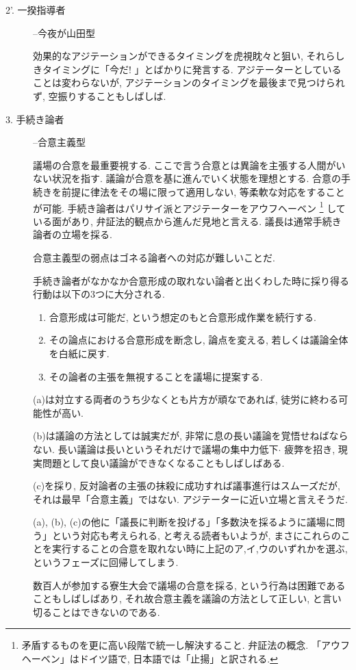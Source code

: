 \documentclass[10pt,b5jsbook,dvips,dvipdfmx,openany]{jsbook}
\theoremstyle{definition}
\begin{document}
\begin{description}
			\item[2'. 一揆指導者] --今夜が山田型

			効果的なアジテーションができるタイミングを虎視眈々と狙い, それらしきタイミングに「今だ! 」とばかりに発言する. アジテーターとしていることは変わらないが, アジテーションのタイミングを最後まで見つけられず, 空振りすることもしばしば.

			\item[3. 手続き論者] --合意主義型

			議場の合意を最重要視する. ここで言う合意とは異論を主張する人間がいない状況を指す. 議論が合意を基に進んでいく状態を理想とする. 合意の手続きを前提に律法をその場に限って適用しない, 等柔軟な対応をすることが可能. 手続き論者はパリサイ派とアジテーターをアウフヘーベン \footnote{矛盾するものを更に高い段階で統一し解決すること. 弁証法の概念. 「アウフヘーベン」はドイツ語で, 日本語では「止揚」と訳される. } している面があり, 弁証法的観点から進んだ見地と言える. 議長は通常手続き論者の立場を採る.

			合意主義型の弱点はゴネる論者への対応が難しいことだ.

			手続き論者がなかなか合意形成の取れない論者と出くわした時に採り得る行動は以下の3つに大分される.

			\begin{tcolorbox}

			\begin{enumerate}

			\renewcommand{\labelenumi}{(\alph{enumi})}

			\item 合意形成は可能だ, という想定のもと合意形成作業を続行する.
			\item その論点における合意形成を断念し, 論点を変える, 若しくは議論全体を白紙に戻す.
			\item その論者の主張を無視することを議場に提案する.

			\end{enumerate}

			\end{tcolorbox}
			(a)は対立する両者のうち少なくとも片方が頑なであれば, 徒労に終わる可能性が高い.

			(b)は議論の方法としては誠実だが, 非常に息の長い議論を覚悟せねばならない. 長い議論は長いというそれだけで議場の集中力低下$ \cdot $ 疲弊を招き, 現実問題として良い議論ができなくなることもしばしばある.

			(c)を採り, 反対論者の主張の抹殺に成功すれば議事進行はスムーズだが, それは最早「合意主義」ではない. アジテーターに近い立場と言えそうだ.

			(a), (b), (c)の他に「議長に判断を投げる」「多数決を採るように議場に問う」という対応も考えられる, と考える読者もいようが, まさにこれらのことを実行することの合意を取れない時に上記のア,イ,ウのいずれかを選ぶ, というフェーズに回帰してしまう.

			数百人が参加する寮生大会で議場の合意を採る, という行為は困難であることもしばしばあり, それ故合意主義を議論の方法として正しい, と言い切ることはできないのである.

			\end{description}
\end{document}
